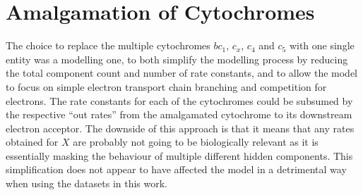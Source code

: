\section{Amalgamation of Cytochromes}
The choice to replace the multiple cytochromes $bc_1$, $c_x$, $c_4$ and $c_5$ with one single entity was a modelling one, to both simplify the modelling process by reducing the total component count and number of rate constants, and to allow the model to focus on simple electron transport chain branching and competition for electrons. The rate constants for each of the cytochromes could be subsumed by the respective ``out rates'' from the amalgamated cytochrome to its downstream electron acceptor. The downside of this approach is that it means that any rates obtained for $X$ are probably not going to be biologically relevant as it is essentially masking the behaviour of multiple different hidden components. This simplification does not appear to have affected the model in a detrimental way when using the datasets in this work.

